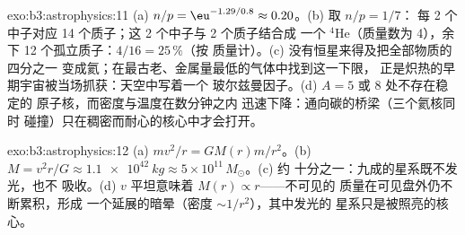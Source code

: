 \begin{solution}{exo:b3:astrophysics:11}
(a) $n/p = \eu^{-1.29/0.8} \approx 0.20$。(b) 取 $n/p = 1/7$：
每 2 个中子对应 14 个质子；这 2 个中子与 2 个质子结合成
一个 $^4$He（质量数为 4），余下 12 个孤立质子：$4/16 = 25\,\%$（按
质量计）。(c) 没有恒星来得及把全部物质的四分之一
变成氦；在最古老、金属量最低的气体中找到这一下限，
正是炽热的早期宇宙被当场抓获：天空中写着一个
玻尔兹曼因子。(d) $A = 5$ 或 $8$ 处不存在稳定的
原子核，而密度与温度在数分钟之内
迅速下降：通向碳的桥梁（三个氦核同时
碰撞）只在稠密而耐心的核心中才会打开。
\end{solution}

\begin{solution}{exo:b3:astrophysics:12}
(a) $mv^2/r = GM(r)m/r^2$。(b) $M = v^2r/G \approx
\qty{1.1e42}{kg} \approx 5\times10^{11}\,M_\odot$。(c) 约
十分之一：九成的星系既不发光，也不
吸收。(d) $v$ 平坦意味着 $M(r) \propto r$——不可见的
质量在可见盘外仍不断累积，形成
一个延展的暗晕（密度 $\sim1/r^2$），其中发光的
星系只是被照亮的核心。
\end{solution}

